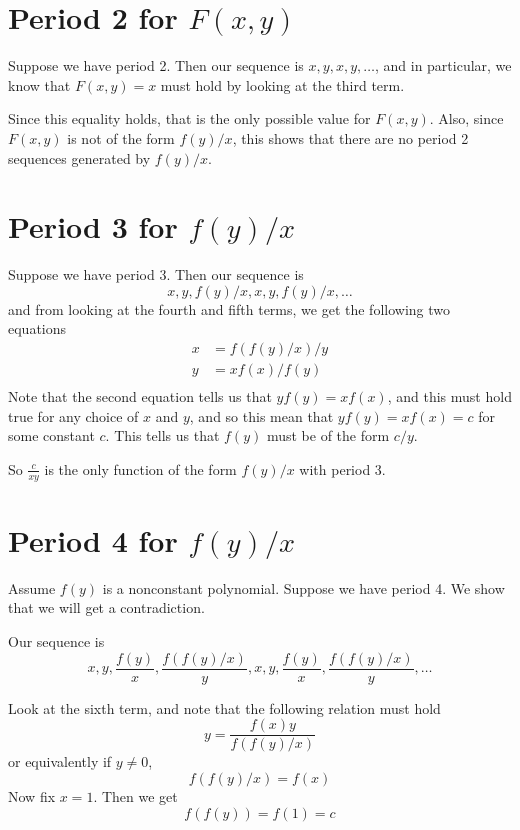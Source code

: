 \documentclass[12pt]{article}
\begin{document}
\maketitle


\section{Period 2 for $F(x,y)$}

Suppose we have period 2. Then our sequence is $x,y,x,y,\dots$, and in particular, we know that $F(x,y) = x$ must hold by looking at the third term.

Since this equality holds, that is the only possible value for $F(x,y)$. Also, since $F(x,y)$ is not of the form $f(y)/x$, this shows that there are no period 2 sequences generated by $f(y)/x$.

\section{Period 3 for $f(y)/x$}

Suppose we have period 3. Then our sequence is
\[ x,y,f(y)/x,x,y,f(y)/x,\dots\]
and from looking at the fourth and fifth terms, we get the following two equations
\begin{align*}
x &= f(f(y)/x)/y\\
y &= xf(x)/f(y)\\
\end{align*}
Note that the second equation tells us that $yf(y) = xf(x)$, and this must hold true for any choice of $x$ and $y$, and so this mean that $yf(y) = xf(x) = c$ for some constant $c$. This tells us that $f(y)$ must be of the form $c/y$.

So $\frac{c}{xy}$ is the only function of the form $f(y)/x$ with period 3.

\section{Period 4 for $f(y)/x$}

Assume $f(y)$ is a nonconstant polynomial. Suppose we have period 4. We show that we will get a contradiction.

Our sequence is
\[ x,y,\frac{f(y)}{x},\frac{f(f(y)/x)}{y},x,y,\frac{f(y)}{x},\frac{f(f(y)/x)}{y},\dots\]

Look at the sixth term, and note that the following relation must hold
\[ y = \frac{f(x)y}{f(f(y)/x)} \]
or equivalently if $y \neq 0$,
\[ f(f(y)/x) = f(x) \]
Now fix $x = 1$. Then we get 
\[ f(f(y)) = f(1) = c \]
\end{document}
